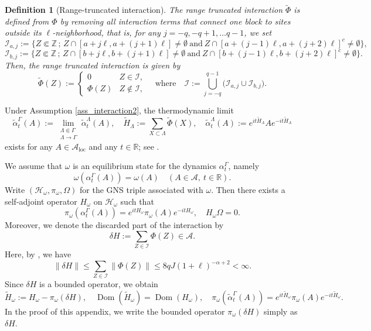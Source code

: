 \documentclass[11pt]{article}
\numberwithin{equation}{section}
\newtheorem{definition}[theorem]{Definition}
\begin{document}
\begin{definition}[Range-truncated interaction]
The range truncated interaction $\tilde{\Phi}$ is defined from $\Phi$ by removing all interaction terms that connect one block to sites outside its $\ell$-neighborhood, that is, for any $j=-q,-q+1,\ldots q-1$, we set
\[
\mathcal{I}_{a,j}:=\{Z\Subset\mathbb{Z}\,;\,
Z\cap[a+j\ell,a+(j+1)\ell]\neq\emptyset
\ \text{and}\ 
Z\cap[a+(j-1)\ell,a+(j+2)\ell]^c\neq\emptyset\},
\]
\[
\mathcal{I}_{b,j}:=\{Z\Subset\mathbb{Z}\,;\,
Z\cap[b+j\ell,b+(j+1)\ell]\neq\emptyset
\ \text{and}\ 
Z\cap[b+(j-1)\ell,b+(j+2)\ell]^c\neq\emptyset\}.
\]
Then, the range truncated interaction is given by
\[
\tilde{\Phi}(Z):=
\begin{cases}
0 & Z\in\mathcal{I},\\
\Phi(Z) & Z\notin\mathcal{I},
\end{cases}
\quad\text{where}\quad
\mathcal{I}:=\bigcup_{j=-q}^{q-1} \Big(\mathcal{I}_{a,j}\cup\mathcal{I}_{b,j}\Big).
\]
\end{definition}

Under Assumption \ref{ass_interaction2}, the thermodynamic limit
\[
\tilde{\alpha}_t^\Gamma(A):=\lim_{\substack{\Lambda\Subset\Gamma\\ \Lambda\to\Gamma}} \tilde{\alpha}_t^\Lambda(A),\quad \tilde{H}_\Lambda:=\sum_{X\subset\Lambda}\tilde{\Phi}(X),\quad \tilde{\alpha}_t^\Lambda(A):=e^{it\tilde{H}_\Lambda}Ae^{-it\tilde{H}_\Lambda}
\]
exists for any $A\in\mathcal{A}_{\mathrm{loc}}$ and any $t\in\mathbb{R}$; see \cite[Theorem 3.5]{Nachtergaele-Sims-Young}.

We assume that $\omega$ is an equilibrium state for the dynamics $\alpha^\Gamma_t$, namely
\[
\omega(\alpha_t^\Gamma(A))=\omega(A)
\quad (A\in\mathcal{A},\ t\in\mathbb{R}).
\]
Write $(\mathcal{H}_\omega,\pi_\omega,\Omega)$ for the GNS triple associated with $\omega$. Then there exists a self-adjoint operator $H_\omega$ on $\mathcal{H}_\omega$ such that
\[
\pi_\omega(\alpha_t^\Gamma(A))=e^{itH_\omega}\pi_\omega(A)e^{-itH_\omega},\quad H_\omega\Omega=0.
\]
Moreover, we denote the discarded part of the interaction by
\[
\delta H:=\sum_{Z\in\mathcal{I}} \Phi(Z)\in\mathcal{A}.
\]
Here, by \cite[Lemma 2]{Kuwahara-Saito2021}, we have
\[
\|\delta H\|\leq\sum_{Z\in\mathcal{I}} \|\Phi(Z)\|
\leq 8qJ(1+\ell)^{-\alpha+2}<\infty.
\]
Since $\delta H$ is a bounded operator, we obtain
\[
\tilde{H}_\omega:=H_\omega-\pi_\omega(\delta H),\quad
\operatorname{Dom}(\tilde{H}_\omega)=\operatorname{Dom}(H_\omega),\quad
\pi_\omega(\tilde{\alpha}_t^\Gamma(A))=e^{it\tilde{H}_\omega}\pi_\omega(A)e^{-it\tilde{H}_\omega}.
\]
In the proof of this appendix, we write the bounded operator $\pi_\omega(\delta H)$ simply as $\delta H$. 
\end{document}
